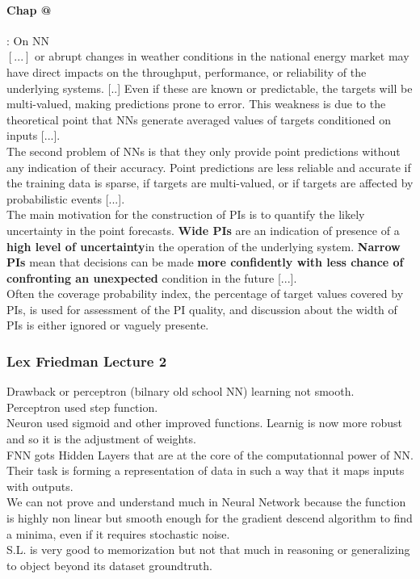 \documentclass[a4paper,12pt]{article}
\makeatletter
\newcommand\bk{\color{black}}
\newcommand\navy{\color{navy}}
\newcommand{\dgreen}{\color{dgreen}}
\newcommand\red{\color{red}}
\numberwithin{equation}{section} %
\newcommand*{\rom}[1]{\expandafter\@slowromancap\romannumeral #1@}
\makeatother
\begin{document}
\paragraph*{Chap \rom{1}} : On NN \\ 
$[...]$ or abrupt changes in weather conditions in the national energy market may have direct impacts on the throughput, performance, or reliability of the underlying systems. 
[..] Even if these are known or predictable, the targets will be multi-valued, making predictions prone to error. This weakness is due to the theoretical point that NNs generate averaged values of targets conditioned on inputs [...]. \\
The second problem of NNs is that they only provide point predictions without any indication of their accuracy. Point predictions are less reliable and accurate if the training data is sparse,  if targets are multi-valued, or if targets are affected by probabilistic events [...]. \\
The main motivation for the construction of \red PIs \bk is to quantify the likely uncertainty in the point forecasts. \navy \textbf{Wide PIs} \bk are an indication of presence of a \navy \textbf{high level of uncertainty}\bk in the operation of the underlying system. \dgreen \textbf{Narrow PIs} \bk mean that decisions can be made \dgreen \textbf{more confidently with less chance of confronting an unexpected} \bk  condition in the future [...].\\
Often the coverage probability index, the percentage of target values covered by PIs, is used for assessment of the PI quality, and discussion about the width of PIs is either ignored or vaguely presente.

\newpage 

\subsubsection*{Lex Friedman Lecture 2}
\noindent Drawback or perceptron (bilnary old school NN) learning not smooth.\\
Perceptron used step function. \\
Neuron used sigmoid and other improved functions. Learnig is now more robust and so it is the adjustment of weights.\\

\noindent FNN gots Hidden Layers that are at the core of the computationnal power of NN. Their task is forming a representation of data in such a way that it maps inputs with outputs. \\
We can not prove and understand much in Neural Network because the function is highly non linear but smooth enough for the gradient descend algorithm to find a minima, even if it requires stochastic noise.\\
S.L. is very good to memorization but not that much in reasoning or generalizing to object beyond its dataset groundtruth.


\newpage



\end{document}
